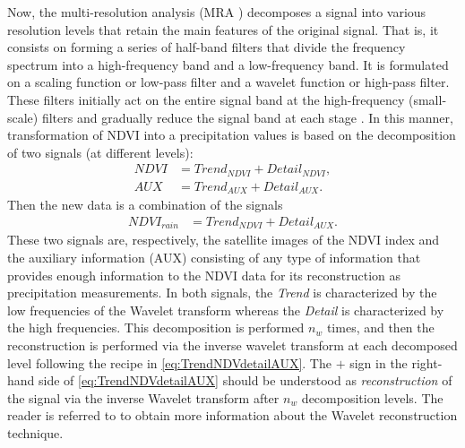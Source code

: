 \documentclass[10pt,letterpaper,conference]{ieeeconf}
\begin{document}
Now, the multi-resolution analysis (MRA \cite{Mallat_89}) decomposes a signal 
into various resolution levels that retain the main features of the original 
signal.  That is, it consists on forming a series of half-band filters that 
divide the  frequency spectrum into a high-frequency band and a low-frequency 
band. It is formulated on a scaling function or low-pass filter and a wavelet 
function or high-pass filter. These filters initially act on the entire signal 
band at the high-frequency (small-scale) filters and gradually reduce the signal
band at each stage \cite{Mallat_89,Heidinger-et-al_2012}. In this manner, 
transformation of NDVI into a precipitation values is based on the 
decomposition of two signals (at different levels):
\begin{align*}
NDVI &= Trend_{NDVI} + Detail_{NDVI},\\
AUX  &= Trend_{AUX}  + Detail_{AUX}.
\end{align*}
Then the new data is a combination of the signals
\begin{align}  \label{eq:TrendNDVdetailAUX}
NDVI_{rain} &= Trend_{NDVI} + Detail_{AUX}.
\end{align}
These two signals are, respectively, the satellite images of the NDVI index and 
the auxiliary information (AUX) consisting of any type of information that 
provides enough information to the NDVI data for its reconstruction as 
precipitation measurements. In both signals, the \emph{Trend} is 
characterized by the low frequencies of the Wavelet transform whereas the 
\emph{Detail} is characterized by the high 
frequencies. This decomposition is performed $n_w$ times, and then the 
reconstruction is performed via the inverse wavelet transform at each decomposed 
level following the recipe in \eqref{eq:TrendNDVdetailAUX}.  The $+$ sign in 
the right-hand side of \eqref{eq:TrendNDVdetailAUX} should be understood as 
\emph{reconstruction} of the signal via the inverse Wavelet transform after 
$n_w$ decomposition levels. The reader is referred to 
\cite{Heidinger-et-al_2012,Quiroz-et-al_2011, Mallat_89} to obtain 
more information about the Wavelet reconstruction technique.	
\end{document}
